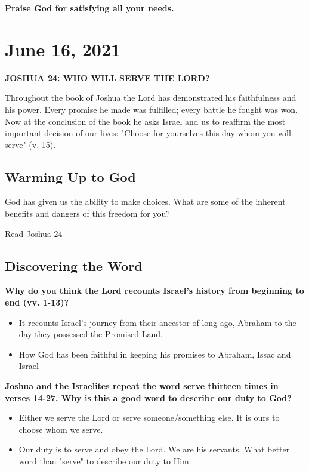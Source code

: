 \documentclass[11pt]{article}
\begin{document}
\textbf{\textbf{Praise God for satisfying all your needs.}}

\section{June 16, 2021}
\label{sec:org17e6dd7}

\textbf{\textbf{JOSHUA 24: WHO WILL SERVE THE LORD?}}

Throughout the book of Joshua the Lord has demonstrated his
faithfulness and his power. Every promise he made was fulfilled; every
battle he fought was won. Now at the conclusion of the book he asks
Israel and us to reaffirm the most important decision of our lives:
"Choose for yourselves this day whom you will serve" (v. 15).

\subsection{Warming Up to God}
\label{sec:org5d414ea}

God has given us the ability to make choices. What are some of the
inherent benefits and dangers of this freedom for you?

\href{https://www.biblegateway.com/passage/?search=Joshua\%2024\&version=NIV\&interface=print}{Read Joshua 24}

\subsection{Discovering the Word}
\label{sec:orgdefae58}

\textbf{\textbf{Why do you think the Lord recounts Israel's history from beginning to end (vv. 1-13)?}}
\begin{itemize}
\item It recounts Israel's journey from their ancestor of long ago,
Abraham to the day they possessed the Promised Land.
\item How God has been faithful in keeping his promises to Abraham, Issac
and Israel
\end{itemize}

\textbf{\textbf{Joshua and the Israelites repeat the word serve thirteen times in verses 14-27. Why is this a good word to describe our duty to God?}}
\begin{itemize}
\item Either we serve the Lord or serve someone/something else. It is ours
to choose whom we serve.
\item Our duty is to serve and obey the Lord. We are his servants. What
better word than "serve" to describe our duty to Him.
\end{itemize}
\end{document}
